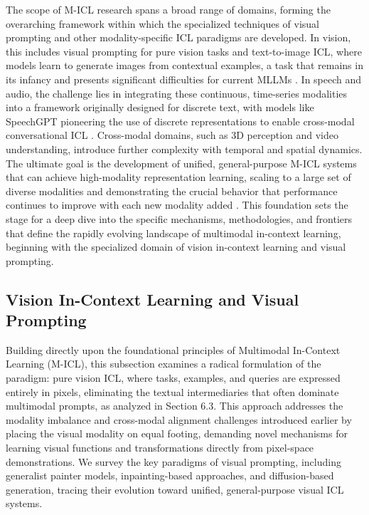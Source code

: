 \documentclass[11pt]{article}
\begin{document}
The scope of M-ICL research spans a broad range of domains, forming the overarching framework within which the specialized techniques of visual prompting and other modality-specific ICL paradigms are developed. In vision, this includes visual prompting for pure vision tasks and text-to-image ICL, where models learn to generate images from contextual examples, a task that remains in its infancy and presents significant difficulties for current MLLMs \cite{ref226}. In speech and audio, the challenge lies in integrating these continuous, time-series modalities into a framework originally designed for discrete text, with models like SpeechGPT pioneering the use of discrete representations to enable cross-modal conversational ICL \cite{ref215}. Cross-modal domains, such as 3D perception and video understanding, introduce further complexity with temporal and spatial dynamics. The ultimate goal is the development of unified, general-purpose M-ICL systems that can achieve high-modality representation learning, scaling to a large set of diverse modalities and demonstrating the crucial behavior that performance continues to improve with each new modality added \cite{ref227}. This foundation sets the stage for a deep dive into the specific mechanisms, methodologies, and frontiers that define the rapidly evolving landscape of multimodal in-context learning, beginning with the specialized domain of vision in-context learning and visual prompting.

\subsection{Vision In-Context Learning and Visual Prompting}

Building directly upon the foundational principles of Multimodal In-Context Learning (M-ICL), this subsection examines a radical formulation of the paradigm: pure vision ICL, where tasks, examples, and queries are expressed entirely in pixels, eliminating the textual intermediaries that often dominate multimodal prompts, as analyzed in Section 6.3. This approach addresses the modality imbalance and cross-modal alignment challenges introduced earlier by placing the visual modality on equal footing, demanding novel mechanisms for learning visual functions and transformations directly from pixel-space demonstrations. We survey the key paradigms of visual prompting, including generalist painter models, inpainting-based approaches, and diffusion-based generation, tracing their evolution toward unified, general-purpose visual ICL systems.
\end{document}
